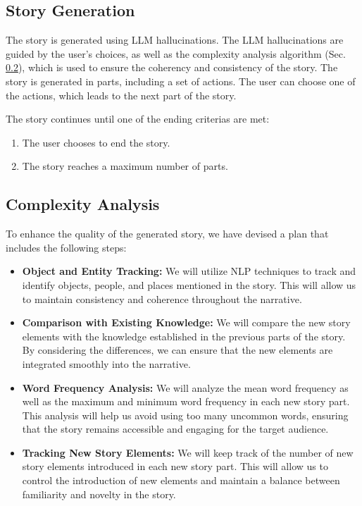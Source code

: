 \documentclass[submit,techrep,english]{ipsj}
\begin{document}
\subsection{Story Generation}
\label{subsec:story-generation}
The story is generated using LLM hallucinations. The LLM hallucinations are guided by the user's choices, as well as the complexity analysis algorithm (Sec. \ref{subsec:complexity-analysis}), which is used to ensure the coherency and consistency of the story. The story is generated in parts, including a set of actions. The user can choose one of the actions, which leads to the next part of the story.

The story continues until one of the ending criterias are met:
\begin{enumerate}
    \item The user chooses to end the story.
    \item The story reaches a maximum number of parts.
\end{enumerate}

\subsection{Complexity Analysis}
\label{subsec:complexity-analysis}
To enhance the quality of the generated story, we have devised a plan that includes the following steps:

\begin{itemize}
    \item \textbf{Object and Entity Tracking:}
          We will utilize NLP techniques to track and identify objects, people, and places mentioned in the story. This will allow us to maintain consistency and coherence throughout the narrative.

    \item \textbf{Comparison with Existing Knowledge:}
          We will compare the new story elements with the knowledge established in the previous parts of the story. By considering the differences, we can ensure that the new elements are integrated smoothly into the narrative.

    \item \textbf{Word Frequency Analysis:}
          We will analyze the mean word frequency as well as the maximum and minimum word frequency in each new story part. This analysis will help us avoid using too many uncommon words, ensuring that the story remains accessible and engaging for the target audience.

    \item \textbf{Tracking New Story Elements:}
          We will keep track of the number of new story elements introduced in each new story part. This will allow us to control the introduction of new elements and maintain a balance between familiarity and novelty in the story.
\end{itemize}
\end{document}
